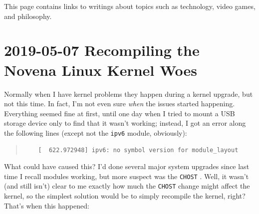 \documentclass{article}
\begin{document}
This page contains links to writings about topics such as technology, video games, and philosophy.

\tableofchildlinks*

\section{2019-05-07 Recompiling the Novena Linux Kernel Woes}
Normally when I have kernel problems they happen during a kernel upgrade, but not this time.  In fact, I'm not even sure \emph{when} the issues started happening.  Everything seemed fine at first, until one day when I tried to mount a USB storage device only to find that it wasn't working; instead, I got an error along the following lines (except not the \texttt{ipv6} module, obviously):

\begin{quote}
\begin{verbatim}
	[  622.972948] ipv6: no symbol version for module_layout
\end{verbatim}
\end{quote}

What could have caused this?  I'd done several major system upgrades since last time I recall modules working, but more suspect was the \texttt{CHOST} .  Well, it wasn't (and still isn't) clear to me exactly how much the \texttt{CHOST} change might affect the kernel, so the simplest solution would be to simply recompile the kernel, right?  That's when this happened:
\end{document}
